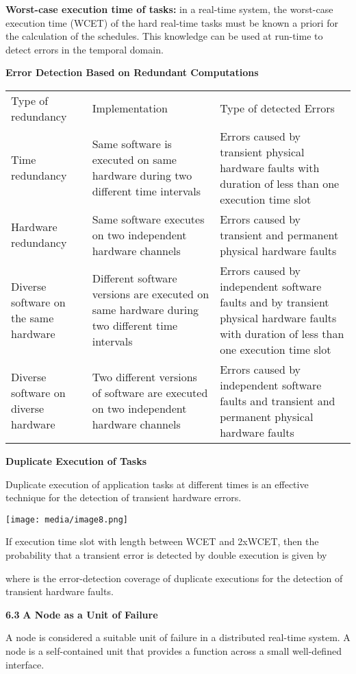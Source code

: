 \textbf{Worst-case execution time of tasks:} in a real-time system, the
worst-case execution time (WCET) of the hard real-time tasks must be
known a priori for the calculation of the schedules. This knowledge can
be used at run-time to detect errors in the temporal domain.

\textbf{Error Detection Based on Redundant Computations}

\begin{longtable}[c]{@{}lll@{}}
\toprule
Type of redundancy & Implementation & Type of detected
Errors\tabularnewline
Time redundancy & Same software is executed on same hardware during two
different time intervals & Errors caused by transient physical hardware
faults with duration of less than one execution time slot\tabularnewline
Hardware redundancy & Same software executes on two independent hardware
channels & Errors caused by transient and permanent physical hardware
faults\tabularnewline
Diverse software on the same hardware & Different software versions are
executed on same hardware during two different time intervals & Errors
caused by independent software faults and by transient physical hardware
faults with duration of less than one execution time slot\tabularnewline
Diverse software on diverse hardware & Two different versions of
software are executed on two independent hardware channels & Errors
caused by independent software faults and transient and permanent
physical hardware faults\tabularnewline
\bottomrule
\end{longtable}

\textbf{Duplicate Execution of Tasks}

Duplicate execution of application tasks at different times is an
effective technique for the detection of transient hardware errors.

\texttt{[image: media/image8.png]}

If execution time slot with length between WCET and 2xWCET, then the
probability that a transient error is detected by double execution is
given by

where is the error-detection coverage of duplicate executions for the
detection of transient hardware faults.

\textbf{6.3} \protect\hypertarget{teil4}{}{}\textbf{A Node as a Unit of
Failure }

A node is considered a suitable unit of failure in a distributed
real-time system. A node is a self-contained unit that provides a
function across a small well-defined interface.

